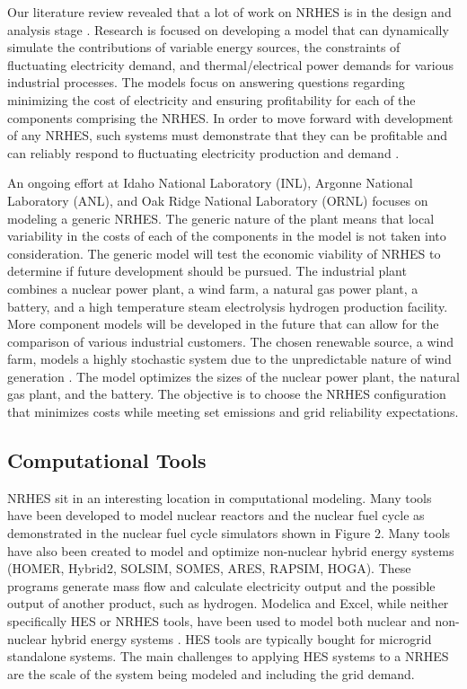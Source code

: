 \documentclass{article}                                                                           %
\begin{document}
\begin{linenumbers}
Our literature review revealed that a lot of work on NRHES is in the design and analysis stage \cite{Boardman2013, Shropshire2012}. Research is focused on developing a model that can dynamically simulate the contributions of variable energy sources, the constraints of fluctuating electricity demand, and thermal/electrical power demands for various industrial processes. The models focus on answering questions regarding minimizing the cost of electricity and ensuring profitability for each of the components comprising the NRHES. In order to move forward with development of any NRHES,  such systems must demonstrate that they can be profitable and can reliably respond to fluctuating electricity production and demand \cite{Rabiti2015}. 

An ongoing effort at Idaho National Laboratory (INL), Argonne National Laboratory (ANL), and Oak Ridge National Laboratory (ORNL) focuses on modeling a generic NRHES. The generic nature of the plant means that local variability in the costs of each of the components in the model is not taken into consideration. The generic model will test the economic viability of NRHES to determine if future development should be pursued. The industrial plant combines a nuclear power plant, a wind farm, a natural gas power plant, a battery, and a high temperature steam electrolysis hydrogen production facility. More component models will be developed in the future that can allow for the comparison of various industrial customers\cite{Harrison2016}. The chosen renewable source, a wind farm, models a highly stochastic system due to the unpredictable nature of wind generation \cite{Chen2016_wind}. The model optimizes the sizes of the nuclear power plant, the natural gas plant, and the battery. The objective is to choose the NRHES configuration that minimizes costs while meeting set emissions and grid reliability expectations.  


\subsection{Computational Tools}
NRHES sit in an interesting location in computational modeling. Many tools have been developed to model nuclear reactors and the nuclear fuel cycle as demonstrated in the nuclear fuel cycle simulators shown in Figure 2. Many tools have also been created to model and optimize non-nuclear hybrid energy systems (HOMER, Hybrid2, SOLSIM, SOMES, ARES, RAPSIM, HOGA)\cite {Bernal-Agustin2009}. These programs generate mass flow and calculate electricity output and the possible output of another product, such as hydrogen. Modelica and Excel, while neither specifically HES or NRHES tools, have been used to model both nuclear and non-nuclear hybrid energy systems \cite{Shropshire2012, Chen2016, Binder2014, Garcia2015, Epiney2016}. HES tools are typically bought for microgrid standalone systems. The main challenges to applying HES systems to a NRHES are the scale of the system being modeled and including the grid demand.


\end{linenumbers}
\end{document}
